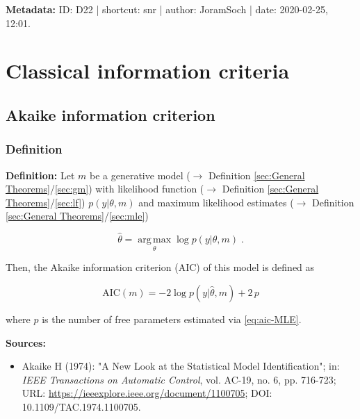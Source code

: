 \documentclass[a4paper,12pt,twoside]{book}
\begin{document}
\vspace{1em}
\textbf{Metadata:} ID: D22 | shortcut: snr | author: JoramSoch | date: 2020-02-25, 12:01.
\vspace{1em}



\pagebreak
\section{Classical information criteria}

\subsection{Akaike information criterion}

\subsubsection[\textit{Definition}]{Definition} \label{sec:aic}
\setcounter{equation}{0}

\textbf{Definition:} Let $m$ be a generative model ($\rightarrow$ Definition \ref{sec:General Theorems}/\ref{sec:gm}) with likelihood function ($\rightarrow$ Definition \ref{sec:General Theorems}/\ref{sec:lf}) $p(y \vert \theta, m)$ and maximum likelihood estimates ($\rightarrow$ Definition \ref{sec:General Theorems}/\ref{sec:mle})

\begin{equation} \label{eq:aic-MLE}
\hat{\theta} = \operatorname*{arg\,max}_\theta \log p(y | \theta, m) \; .
\end{equation}

Then, the Akaike information criterion (AIC) of this model is defined as

\begin{equation} \label{eq:aic-AIC}
\mathrm{AIC}(m) = -2 \log p(y | \hat{\theta}, m) + 2 \, p
\end{equation}

where $p$ is the number of free parameters estimated via \eqref{eq:aic-MLE}.


\vspace{1em}
\textbf{Sources:}
\begin{itemize}
\item Akaike H (1974): "A New Look at the Statistical Model Identification"; in: \textit{IEEE Transactions on Automatic Control}, vol. AC-19, no. 6, pp. 716-723; URL: \url{https://ieeexplore.ieee.org/document/1100705}; DOI: 10.1109/TAC.1974.1100705.
\end{itemize}
\end{document}
